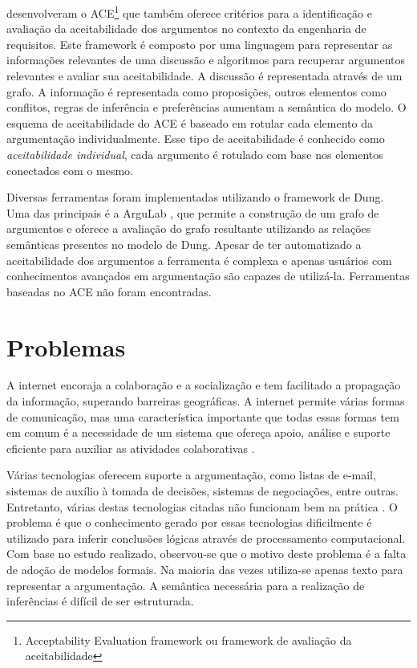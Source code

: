  desenvolveram o ACE\footnote{Acceptability Evaluation framework ou framework de avaliação da aceitabilidade} que também oferece critérios para a identificação e avaliação da aceitabilidade dos argumentos no contexto da engenharia de requisitos. Este framework é composto por uma linguagem para representar as informações relevantes de uma discussão e algoritmos para recuperar argumentos relevantes e avaliar sua aceitabilidade. A discussão é representada através de um grafo.  A informação é representada como proposições, outros elementos como conflitos, regras de inferência e preferências aumentam a semântica do modelo. O esquema de aceitabilidade do ACE é baseado em rotular cada elemento da argumentação individualmente. Esse tipo de aceitabilidade é conhecido como \textit{aceitabilidade individual}, cada argumento é rotulado com base nos elementos conectados com o mesmo.
%

Diversas ferramentas foram implementadas utilizando o framework de Dung. Uma das principais é a ArguLab \cite{podlaszewski2011IBA}, que permite a construção de um grafo de argumentos e oferece a avaliação do grafo resultante utilizando as relações semânticas presentes no modelo de Dung. Apesar de ter automatizado a aceitabilidade dos argumentos a ferramenta é complexa e apenas usuários com conhecimentos avançados em argumentação são capazes de utilizá-la. Ferramentas baseadas no ACE não foram encontradas. 

\section{Problemas}

A internet encoraja a colaboração e a socialização e tem facilitado a propagação da informação, superando barreiras geográficas. A internet permite várias formas de comunicação, mas uma característica importante que todas essas formas tem em comum é a necessidade de um sistema que ofereça apoio, análise e suporte eficiente para auxiliar as atividades colaborativas \cite{daniil2012AFA}.

Várias tecnologias oferecem suporte a argumentação, como listas de e-mail, sistemas de auxílio à tomada de decisões, sistemas de negociações, entre outras. Entretanto, várias destas tecnologias citadas não funcionam bem na prática \cite{moor2006AST}. O problema é que o conhecimento gerado por essas tecnologias dificilmente é utilizado para inferir conclusões lógicas através de processamento computacional. Com base no estudo realizado, observou-se que o motivo deste problema é a falta de adoção de modelos formais. Na maioria das vezes utiliza-se apenas texto para representar a argumentação. A semântica necessária para a realização de inferências é difícil de ser estruturada.

